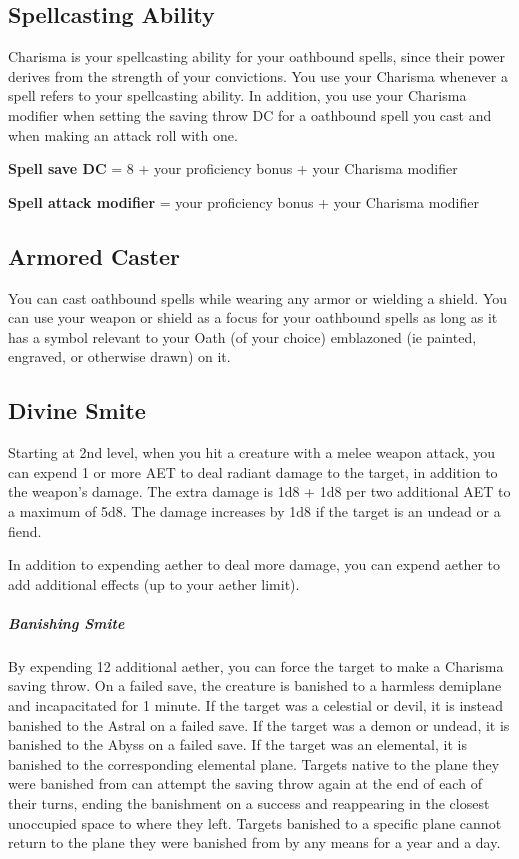 \subsection{Spellcasting Ability}

Charisma is your spellcasting ability for your oathbound spells, since their power derives from the strength of your convictions. You use your Charisma whenever a spell refers to your spellcasting ability. In addition, you use your Charisma modifier when setting the saving throw DC for a oathbound spell you cast and when making an attack roll with one.

\textbf{Spell save DC} = 8 + your proficiency bonus + your Charisma modifier

\textbf{Spell attack modifier} = your proficiency bonus + your Charisma modifier

\subsection{Armored Caster}
You can cast oathbound spells while wearing any armor or wielding a shield. You can use your weapon or shield as a focus for your oathbound spells as long as it has a symbol relevant to your Oath (of your choice) emblazoned (ie painted, engraved, or otherwise drawn) on it.

\subsection{Divine Smite}

Starting at 2nd level, when you hit a creature with a melee weapon attack, you can expend 1 or more AET to deal radiant damage to the target, in addition to the weapon's damage. The extra damage is 1d8 + 1d8 per two additional AET to a maximum of 5d8. The damage increases by 1d8 if the target is an undead or a fiend.

In addition to expending aether to deal more damage, you can expend aether to add additional effects (up to your aether limit).

\subparagraph*{Banishing Smite} By expending 12 additional aether, you can force the target to make a Charisma saving throw. On a failed save, the creature is banished to a harmless demiplane and incapacitated for 1 minute. If the target was a celestial or devil, it is instead banished to the Astral on a failed save. If the target was a demon or undead, it is banished to the Abyss on a failed save. If the target was an elemental, it is banished to the corresponding elemental plane. Targets native to the plane they were banished from can attempt the saving throw again at the end of each of their turns, ending the banishment on a success and reappearing in the closest unoccupied space to where they left. Targets banished to a specific plane cannot return to the plane they were banished from by any means for a year and a day.

